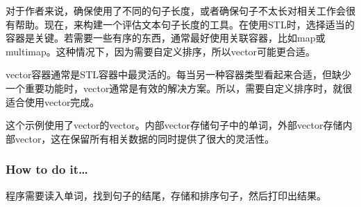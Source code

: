
对于作者来说，确保使用了不同的句子长度，或者确保句子不太长对相关工作会很有帮助。现在，来构建一个评估文本句子长度的工具。在使用STL时，选择适当的容器是关键。若需要一些有序的东西，通常最好使用关联容器，比如map或multimap。这种情况下，因为需要自定义排序，所以vector可能更合适。

vector容器通常是STL容器中最灵活的。每当另一种容器类型看起来合适，但缺少一个重要功能时，vector通常是有效的解决方案。所以，需要自定义排序时，就很适合使用vector完成。

这个示例使用了vector的vector。内部vector存储句子中的单词，外部vector存储内部vector，这在保留所有相关数据的同时提供了很大的灵活性。

\subsubsection{How to do it…}

程序需要读入单词，找到句子的结尾，存储和排序句子，然后打印出结果。

